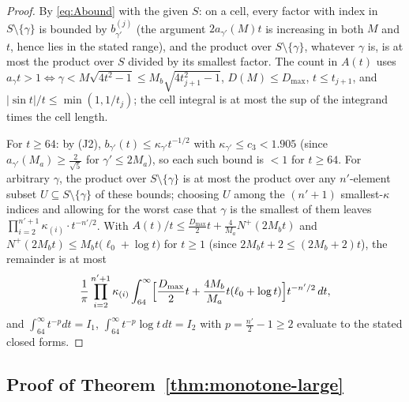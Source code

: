 \begin{proof}
By \eqref{eq:Abound} with the given $S$: on a cell, every factor with
index in $S\setminus\{\gamma\}$ is bounded by $b^{(j)}_{\gamma'}$
(the argument $2a_{\gamma'}(M)t$ is increasing in both $M$ and $t$,
hence lies in the stated range), and the product over
$S\setminus\{\gamma\}$, whatever $\gamma$ is, is at most the product
over $S$ divided by its smallest factor. The count in $A(t)$ uses
$a_\gamma t>1\iff\gamma<M\sqrt{4t^2-1}\le M_b\sqrt{4t_{j+1}^2-1}$,
$D(M)\le D_{\max}$, $t\le t_{j+1}$, and $|\sin t|/t\le\min(1,1/t_j)$;
the cell integral is at most the sup of the integrand times the cell
length.

For $t\ge64$: by (J2), $b_{\gamma'}(t)\le\kappa_{\gamma'}t^{-1/2}$
with $\kappa_{\gamma'}\le c_3<1.905$ (since
$a_{\gamma'}(M_a)\ge\tfrac2{\sqrt5}$ for $\gamma'\le2M_a$), so each
such bound is $<1$ for $t\ge64$. For arbitrary $\gamma$, the product
over $S\setminus\{\gamma\}$ is at most the product over any
$n'$-element subset $U\subseteq S\setminus\{\gamma\}$ of these
bounds; choosing $U$ among the $(n'+1)$ smallest-$\kappa$ indices and
allowing for the worst case that $\gamma$ is the smallest of them
leaves $\prod_{i=2}^{n'+1}\kappa_{(i)}\cdot t^{-n'/2}$. With
$A(t)/t\le\tfrac{D_{\max}}2t+\tfrac4{M_a}N^+(2M_bt)$ and
$N^+(2M_bt)\le M_bt\bigl(\ell_0+\log t\bigr)$ for $t\ge1$ (since
$2M_bt+2\le(2M_b+2)t$), the remainder is at most
\[
\frac1\pi\prod_{i=2}^{n'+1}\kappa_{(i)}
\int_{64}^\infty\Bigl[\frac{D_{\max}}2t
+\frac{4M_b}{M_a}t(\ell_0+\log t)\Bigr]t^{-n'/2}\,dt ,
\]
and $\int_{64}^\infty t^{-p}dt=I_1$,
$\int_{64}^\infty t^{-p}\log t\,dt=I_2$ with $p=\tfrac{n'}2-1\ge2$
evaluate to the stated closed forms.
\end{proof}

\subsection*{Proof of Theorem~\ref{thm:monotone-large}}

